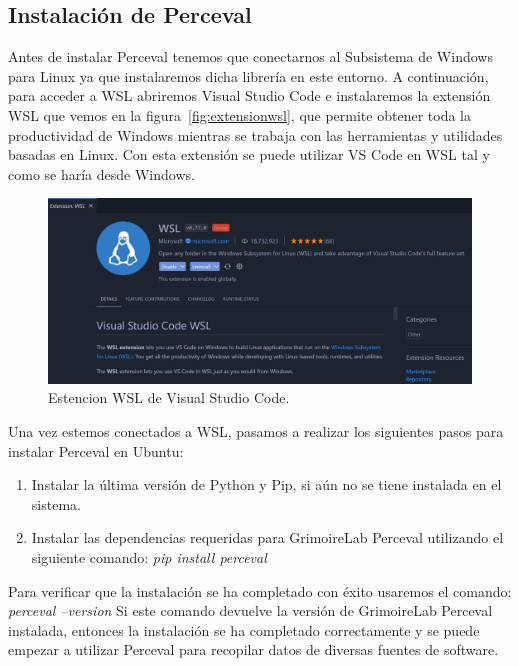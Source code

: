\documentclass[a4paper, 12pt]{book}
\begin{document}
\subsection{Instalación de Perceval} %
\label{sec:instalación de perceval}

Antes de instalar Perceval tenemos que conectarnos al Subsistema de Windows para Linux ya que instalaremos dicha librería en este entorno.
A continuación, para acceder a WSL abriremos Visual Studio Code e instalaremos la extensión WSL que vemos en la figura~\ref{fig:extensionwsl}, que permite obtener toda la productividad de Windows mientras se trabaja con las herramientas y utilidades basadas en Linux.
Con esta extensión se puede utilizar VS Code en WSL tal y como se haría desde Windows.

\begin{figure}
  \centering
  \includegraphics[width=14cm, keepaspectratio]{img/extension_wsl.PNG}
  \caption{Estencion WSL de Visual Studio Code.}\label{fig:estensionwsl}
\end{figure}

Una vez estemos conectados a WSL, pasamos a realizar los siguientes pasos para instalar Perceval en Ubuntu:
\begin{enumerate}
  \item Instalar la última versión de Python y Pip, si aún no se tiene instalada en el sistema.
  \item Instalar las dependencias requeridas para GrimoireLab Perceval utilizando el siguiente comando: \emph{pip install perceval}
\end{enumerate}

Para verificar que la instalación se ha completado con éxito usaremos el comando: \emph{perceval --version} 
Si este comando devuelve la versión de GrimoireLab Perceval instalada, entonces la instalación se ha completado correctamente y se puede empezar a utilizar Perceval para recopilar datos de diversas fuentes de software.
\end{document}
